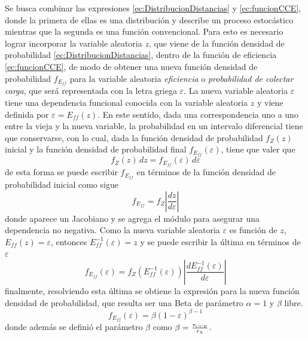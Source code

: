 Se busca combinar las expresiones \eqref{ec:DistribucionDistancias} y \eqref{ec:funcionCCE}, donde la primera de ellas es una distribución y describe un proceso estocástico mientras que la segunda es una función convencional. Para esto es necesario lograr incorporar la variable aleatoria $z$, que viene de la función densidad de probabilidad \eqref{ec:DistribucionDistancias}, dentro de la función de eficiencia \eqref{ec:funcionCCE}, de modo de obtener una nueva función densidad de probabilidad $f_{E_{ff}}$ para la variable aleatoria \textit{eficiencia} o \textit{probabilidad de colectar carga}, que será representada con la letra griega $\varepsilon$. La nueva variable aleatoria $\varepsilon$ tiene una dependencia funcional conocida con la variable aleatoria $z$ y viene definida por $\varepsilon = E_{ff}(z)$. En este sentido, dada una correspondencia uno a uno entre la vieja y la nueva variable, la probabilidad en un intervalo diferencial tiene que conservarse, con lo cual, dada la función densidad de probabilidad $f_{Z}(z)$ inicial y la función densidad de probabilidad final $f_{E_{ff}}(\varepsilon)$, tiene que valer que
\begin{equation*}
    f_{Z}(z)\,dz = f_{E_{ff}}(\varepsilon)\,d\varepsilon
\end{equation*}
de esta forma se puede escribir $f_{E_{ff}}$ en términos de la función densidad de probabilidad inicial como sigue
\begin{equation*}
    f_{E_{ff}} 
    = f_{Z}
    \left|
        \frac{dz}{d\varepsilon}
    \right|
\end{equation*}
donde aparece un Jacobiano y se agrega el módulo para asegurar una dependencia no negativa. Como la nueva variable aleatoria $\varepsilon$ es función de $z$, $E_{ff}(z) = \varepsilon$, entonces $E_{ff}^{-1}(\varepsilon) = z$ y se puede escribir la última en términos de $\varepsilon$
\begin{equation*}
    f_{E_{ff}}(\varepsilon) 
    = f_{Z}
    \left(
        E_{ff}^{-1}(\varepsilon)
    \right)
    \left|
        \frac{dE_{ff}^{-1}(\varepsilon)}{d\varepsilon}
    \right|
\end{equation*}
finalmente, resolviendo esta última se obtiene la expresión para la nueva función densidad de probabilidad, que resulta ser una Beta de parámetro $\alpha = 1$ y $\beta$ libre.
\begin{equation*}
    f_{E_{ff}}(\varepsilon) = \beta (1 - \varepsilon)^{\beta - 1}
\end{equation*}
donde además se definió el parámetro $\beta$ como $\beta = \frac{\tau_{\scaleto{CCE}{3pt}}}{\tau_{\scaleto{X}{3pt}}}$. 
